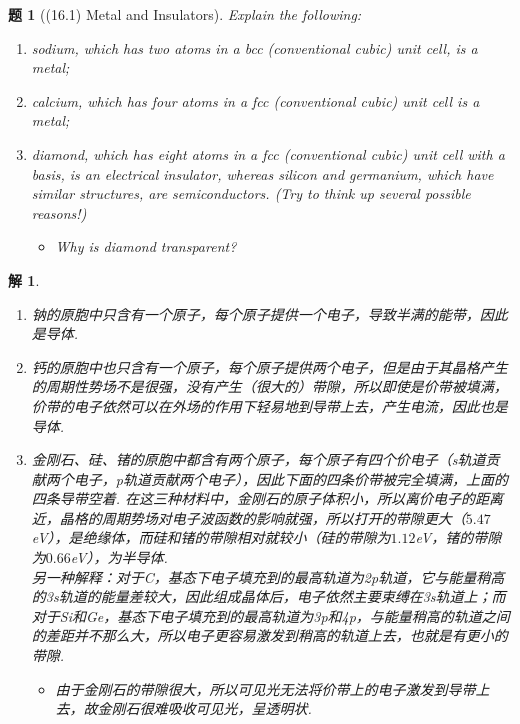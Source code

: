 \documentclass[UTF8,10pt,a4paper]{article}
\theoremstyle{Problem}
\newtheorem{prob}{题}
\theoremstyle{Solution}
\newtheorem*{sol}{解}
\begin{document}
\thispagestyle{FirstPageStyle}
\begin{prob}[(16.1) Metal and Insulators]
    Explain the following:
    \begin{enumerate}
        \item[(a)] sodium, which has two atoms in a bcc (conventional cubic) unit cell, is a metal;
        \item[(b)] calcium, which has four atoms in a fcc (conventional cubic) unit cell is a metal;
        \item[(c)] diamond, which has eight atoms in a fcc (conventional cubic) unit cell with a basis, is an electrical insulator, whereas silicon and germanium, which have similar structures, are semiconductors. (Try to think up several possible reasons!)
        \begin{itemize}
            \item[$\triangleright$] Why is diamond transparent?
        \end{itemize}
    \end{enumerate}
\end{prob}
\begin{sol}
    \begin{enumerate}
        \item[(a)] 钠的原胞中只含有一个原子，每个原子提供一个电子，导致半满的能带，因此是导体.
        \item[(b)] 钙的原胞中也只含有一个原子，每个原子提供两个电子，但是由于其晶格产生的周期性势场不是很强，没有产生（很大的）带隙，所以即使是价带被填满，价带的电子依然可以在外场的作用下轻易地到导带上去，产生电流，因此也是导体.
        \item[(c)] 金刚石、硅、锗的原胞中都含有两个原子，每个原子有四个价电子（s轨道贡献两个电子，p轨道贡献两个电子），因此下面的四条价带被完全填满，上面的四条导带空着. 在这三种材料中，金刚石的原子体积小，所以离价电子的距离近，晶格的周期势场对电子波函数的影响就强，所以打开的带隙更大（$5.47$eV），是绝缘体，而硅和锗的带隙相对就较小（硅的带隙为$1.12$eV，锗的带隙为$0.66$eV），为半导体.\\
        另一种解释：对于C，基态下电子填充到的最高轨道为2p轨道，它与能量稍高的3s轨道的能量差较大，因此组成晶体后，电子依然主要束缚在3s轨道上；而对于Si和Ge，基态下电子填充到的最高轨道为3p和4p，与能量稍高的轨道之间的差距并不那么大，所以电子更容易激发到稍高的轨道上去，也就是有更小的带隙.
        \begin{itemize}
            \item[$\triangleright$] 由于金刚石的带隙很大，所以可见光无法将价带上的电子激发到导带上去，故金刚石很难吸收可见光，呈透明状.
        \end{itemize}
    \end{enumerate}
\end{sol}
\end{document}
